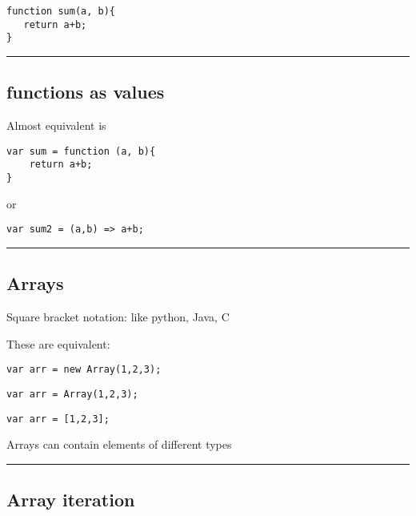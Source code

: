 \begin{verbatim}
function sum(a, b){
   return a+b;
}
\end{verbatim}

\begin{center}\rule{0.5\linewidth}{\linethickness}\end{center}

\hypertarget{functions-as-values}{%
\subsection{functions as values}\label{functions-as-values}}

Almost equivalent is

\begin{verbatim}
var sum = function (a, b){
    return a+b;
}
\end{verbatim}

or

\begin{verbatim}
var sum2 = (a,b) => a+b;
\end{verbatim}

\begin{center}\rule{0.5\linewidth}{\linethickness}\end{center}

\hypertarget{arrays}{%
\subsection{Arrays}\label{arrays}}

Square bracket notation: like python, Java, C

These are equivalent:

\begin{verbatim}
var arr = new Array(1,2,3);
\end{verbatim}

\begin{verbatim}
var arr = Array(1,2,3);
\end{verbatim}

\begin{verbatim}
var arr = [1,2,3];
\end{verbatim}

Arrays can contain elements of different types

\begin{center}\rule{0.5\linewidth}{\linethickness}\end{center}

\hypertarget{array-iteration}{%
\subsection{Array iteration}\label{array-iteration}}

